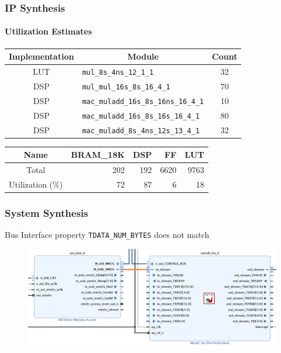 \documentclass[aspectratio=169]{beamer}
\begin{document}
\begin{frame}
    \frametitle{IP Synthesis}
    \framesubtitle{Utilization Estimates}

    \begin{table}
        \begin{tabular}{clc}
            \toprule
            Implementation & \multicolumn{1}{c}{Module}                    & Count \\
            \midrule
            LUT            & \texttt{mul\_8s\_4ns\_12\_1\_1}               & 32    \\
            DSP            & \texttt{mul\_mul\_16s\_8s\_16\_4\_1}          & 70    \\
            DSP            & \texttt{mac\_muladd\_16s\_8s\_16ns\_16\_4\_1} & 10    \\
            DSP            & \texttt{mac\_muladd\_16s\_8s\_16s\_16\_4\_1}  & 80    \\
            DSP            & \texttt{mac\_muladd\_8s\_4ns\_12s\_13\_4\_1}  & 32    \\
            \bottomrule
        \end{tabular}
    \end{table}

    \begin{table}
        \begin{tabularx}{\textwidth}{cRRRR}
            \toprule
            Name             & BRAM\_18K & DSP & FF   & LUT  \\
            \midrule
            Total            & 202       & 192 & 6620 & 9763 \\
            Utilization (\%) & 72        & 87  & 6    & 18   \\
            \bottomrule
        \end{tabularx}
    \end{table}

\end{frame}


\begin{frame}
    \frametitle{System Synthesis}

    Bus Interface property \texttt{TDATA\_NUM\_BYTES} does not match
    \begin{figure}
        \includegraphics[scale=0.32]{images/tdata-mismatch.png}
    \end{figure}

\end{frame}
\end{document}
